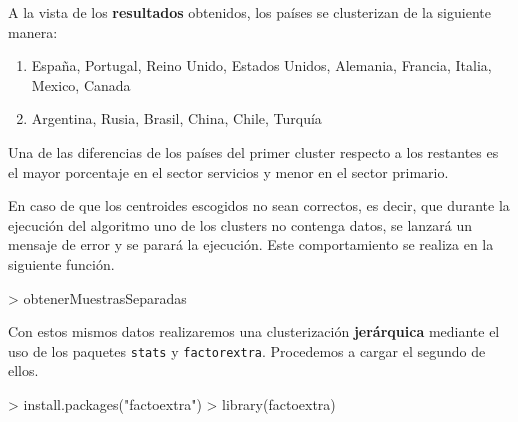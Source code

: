 \documentclass [a4paper] {article}
\begin{document}
\bigskip
A la vista de los \textbf{resultados} obtenidos, los países se clusterizan de la siguiente manera:
\begin{enumerate}
\item España, Portugal, Reino Unido, Estados Unidos, Alemania, Francia, Italia, Mexico, Canada
\item Argentina, Rusia, Brasil, China, Chile, Turquía
\end{enumerate}

Una de las diferencias de los países del primer cluster respecto a los restantes es el mayor 
porcentaje en el sector servicios y menor en el sector primario.

\bigskip
En caso de que los centroides escogidos no sean correctos, es decir, que durante la ejecución del algoritmo uno de los clusters no contenga
datos, se lanzará un mensaje de error y se parará la ejecución. Este comportamiento se realiza en la siguiente función.
\begin{Schunk}
\begin{Sinput}
> obtenerMuestrasSeparadas
\end{Sinput}
\end{Schunk}

\bigskip
Con estos mismos datos realizaremos una clusterización \textbf{jerárquica} mediante el uso de los
paquetes \texttt{stats} y \texttt{factorextra}. Procedemos a cargar el segundo de ellos.
\begin{Schunk}
\begin{Sinput}
> install.packages("factoextra")
> library(factoextra)
\end{Sinput}
\end{Schunk}
\end{document}
